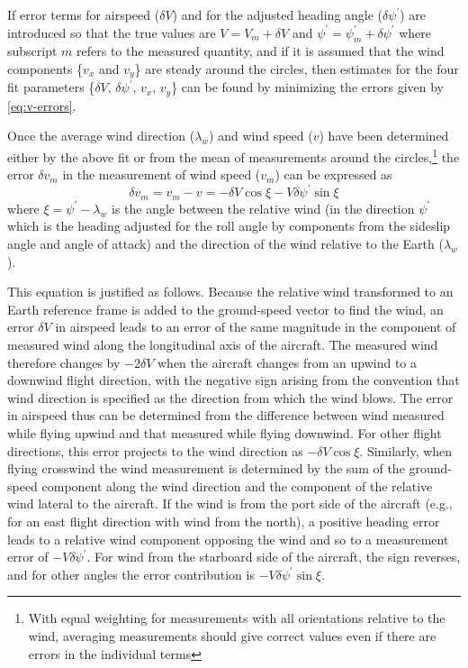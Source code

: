\documentclass[12pt,twoside,english]{article}\usepackage[]{graphicx}\usepackage[]{color}
\begin{document}
{{If error terms for airspeed ($\delta V$) and for the adjusted heading angle ($\delta\psi^{\prime}$) are introduced so that the true values are $V=V_{m}+\delta V$ and $\psi^{\prime}=\psi_{m}^{\prime}+\delta\psi^{\prime}$ where subscript $m$ refers to the measured quantity, and if it is assumed that the wind components \{$v_{x}$ and $v_{y}$\} are steady around the circles, then estimates for the four fit parameters \{$\delta V,\,\delta\psi^{\prime},\,v_{x},\,v_{y}$\} can be found by minimizing the errors given by \eqref{eq:v-errors}. 

Once the average wind direction ($\lambda_w$) and wind speed ($v$) have been determined either by the above fit or from the mean of measurements around the circles,\footnote{With equal weighting for measurements with all orientations relative to the wind, averaging measurements should give correct values even if there are errors in the individual terms} the error $\delta v_{m}$ in the measurement of wind speed ($v_{m}$) can be expressed as\\ 
\begin{equation}
\delta v_{m}=v_{m}-v=-\delta V\cos\xi-V\delta\psi^{\prime}\sin\xi\label{eq:delta-v-m} 
\end{equation}
%
where $\xi=\psi^{\prime}-\lambda_w$ is the angle between the relative wind (in the direction $\psi^{\prime}$ which is the heading adjusted for the roll angle by components from the sideslip angle and angle of attack) and the direction of the wind relative to the Earth ($\lambda_w$). 

This equation is justified as follows. Because the relative wind transformed to an Earth reference frame is added to the ground-speed vector to find the wind, an error $\delta V$ in airspeed leads to an error of the same magnitude in the component of measured wind along the longitudinal axis of the aircraft. The measured wind therefore changes by $-2\delta V$ when the aircraft changes from an upwind to a downwind flight direction, with the negative sign arising from the convention that wind direction is specified as the direction from which the wind blows. The error in airspeed thus can be determined from the difference between wind measured while flying upwind and that measured while flying downwind. For other flight directions, this error projects to the wind direction as $-\delta V\cos\xi$. Similarly, when flying crosswind the wind measurement is determined by the sum of the ground-speed component along the wind direction and the component of the relative wind lateral to the aircraft. If the wind is from the port side of the aircraft (e.g., for an east flight direction with wind from the north), a positive heading error leads to a relative wind component opposing the wind and so to a measurement error of $-V\delta\psi^{\prime}$. For wind from the starboard side of the aircraft, the sign reverses, and for other angles the error contribution is $-V\delta\psi^{\prime}\sin\xi$. 

}}
\end{document}

